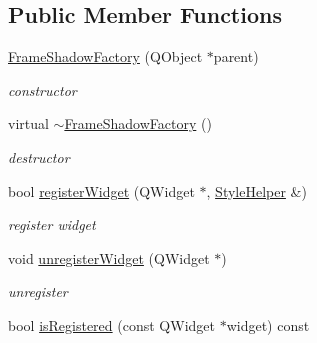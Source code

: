 \subsection*{Public Member Functions}
\begin{DoxyCompactItemize}
\item 
\mbox{\label{class_frame_shadow_factory_af4029777c6a04200abc54e1065fa0d65}} 
\hyperlink{class_frame_shadow_factory_af4029777c6a04200abc54e1065fa0d65}{Frame\+Shadow\+Factory} (Q\+Object $\ast$parent)
\begin{DoxyCompactList}\small\item\em constructor \end{DoxyCompactList}\item 
\mbox{\label{class_frame_shadow_factory_aebe2d1601a58b60e69639e26e2610b80}} 
virtual \hyperlink{class_frame_shadow_factory_aebe2d1601a58b60e69639e26e2610b80}{$\sim$\+Frame\+Shadow\+Factory} ()
\begin{DoxyCompactList}\small\item\em destructor \end{DoxyCompactList}\item 
\mbox{\label{class_frame_shadow_factory_a33ea09d3ffea415491b2539a0ac99bc7}} 
bool \hyperlink{class_frame_shadow_factory_a33ea09d3ffea415491b2539a0ac99bc7}{register\+Widget} (Q\+Widget $\ast$, \hyperlink{class_style_helper}{Style\+Helper} \&)
\begin{DoxyCompactList}\small\item\em register widget \end{DoxyCompactList}\item 
\mbox{\label{class_frame_shadow_factory_a88cda5afa2b16c3d881e2160f3190280}} 
void \hyperlink{class_frame_shadow_factory_a88cda5afa2b16c3d881e2160f3190280}{unregister\+Widget} (Q\+Widget $\ast$)
\begin{DoxyCompactList}\small\item\em unregister \end{DoxyCompactList}\item 
\mbox{\label{class_frame_shadow_factory_a19d222ba74fb648bbdbcb3afc07a1d4f}} 
bool \hyperlink{class_frame_shadow_factory_a19d222ba74fb648bbdbcb3afc07a1d4f}{is\+Registered} (const Q\+Widget $\ast$widget) const

\end{DoxyCompactItemize}
